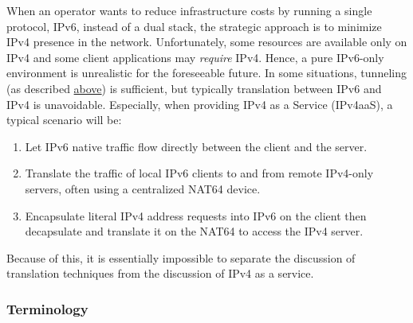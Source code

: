 \documentclass[
]{article}
\providecommand{\tightlist}{%
  \setlength{\itemsep}{0pt}\setlength{\parskip}{0pt}}
\begin{document}
When an operator wants to reduce infrastructure costs by running a
single protocol, IPv6, instead of a dual stack, the strategic approach
is to minimize IPv4 presence in the network. Unfortunately, some
resources are available only on IPv4 and some client applications may
\emph{require} IPv4. Hence, a pure IPv6-only environment is unrealistic
for the foreseeable future. In some situations, tunneling (as described
\hyperref[tunnels]{above}) is sufficient, but typically translation
between IPv6 and IPv4 is unavoidable. Especially, when providing IPv4 as
a Service (IPv4aaS), a typical scenario will be:

\begin{enumerate}
\def\labelenumi{\arabic{enumi}.}
\tightlist
\item
  Let IPv6 native traffic flow directly between the client and the
  server.
\item
  Translate the traffic of local IPv6 clients to and from remote
  IPv4-only servers, often using a centralized NAT64 device.
\item
  Encapsulate literal IPv4 address requests into IPv6 on the client then
  decapsulate and translate it on the NAT64 to access the IPv4 server.
\end{enumerate}

Because of this, it is essentially impossible to separate the discussion
of translation techniques from the discussion of IPv4 as a service.

\subsubsection{Terminology}\label{terminology}
\end{document}
